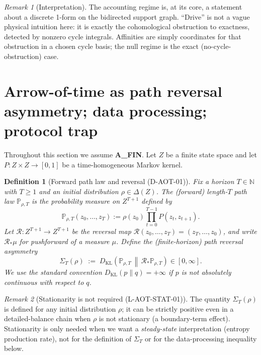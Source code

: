 \documentclass[11pt]{article}
\newtheorem{definition}{Definition}
\theoremstyle{remark}
\newtheorem{remark}{Remark}
\begin{document}
\begin{remark}[Interpretation]
The accounting regime is, at its core, a statement about a discrete 1-form on the bidirected support graph.
``Drive'' is not a vague physical intuition here: it is exactly the cohomological obstruction to exactness, detected by nonzero cycle integrals.
Affinities are simply coordinates for that obstruction in a chosen cycle basis; the null regime is the exact (no-cycle-obstruction) case.
\end{remark}

\section{Arrow-of-time as path reversal asymmetry; data processing; protocol trap}\label{sec:aot}

Throughout this section we assume \textbf{A\_FIN}. Let $Z$ be a finite state space and let
$P:Z\times Z\to [0,1]$ be a time-homogeneous Markov kernel.

\begin{definition}[Forward path law and reversal (D-AOT-01)]
Fix a horizon $T\in \mathbb N$ with $T\ge 1$ and an initial distribution $\rho\in\Delta(Z)$.
The (forward) length-$T$ path law $\mathbb P_{\rho,T}$ is the probability measure on $Z^{T+1}$ defined by
\[
\mathbb P_{\rho,T}(z_0,\dots,z_T)
:= \rho(z_0)\prod_{t=0}^{T-1} P(z_t,z_{t+1}).
\]
Let $\mathcal R:Z^{T+1}\to Z^{T+1}$ be the reversal map $\mathcal R(z_0,\dots,z_T)=(z_T,\dots,z_0)$, and write $\mathcal R_*\mu$ for pushforward of a measure $\mu$.
Define the (finite-horizon) \emph{path reversal asymmetry}
\[
\Sigma_T(\rho)\;:=\; D_{\mathrm{KL}}\!\left(\mathbb P_{\rho,T}\,\middle\|\,\mathcal R_*\mathbb P_{\rho,T}\right)\in[0,\infty].
\]
We use the standard convention $D_{\mathrm{KL}}(p\|q)=+\infty$ if $p$ is not absolutely continuous with respect to $q$.
\end{definition}

\begin{remark}[Stationarity is not required (L-AOT-STAT-01)]
The quantity $\Sigma_T(\rho)$ is defined for any initial distribution $\rho$; it can be strictly positive even in a detailed-balance chain when $\rho$ is not stationary (a boundary-term effect).
Stationarity is only needed when we want a \emph{steady-state} interpretation (entropy production rate), not for the definition of $\Sigma_T$ or for the data-processing inequality below.
\end{remark}
\end{document}
